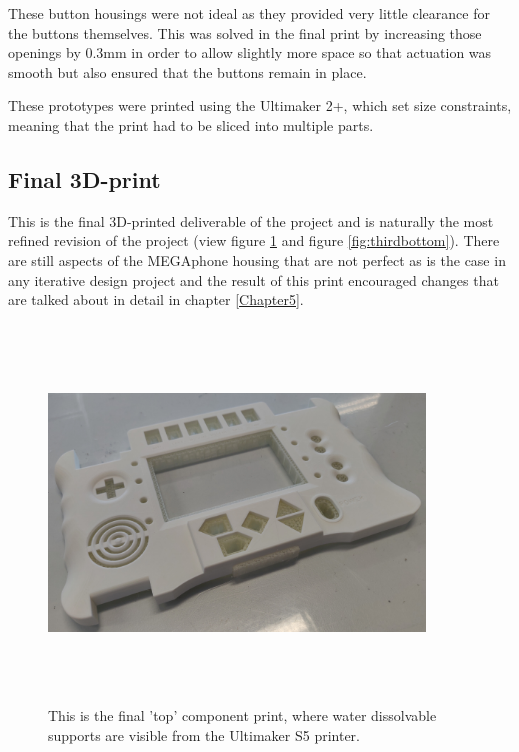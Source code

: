 These button housings were not ideal as they provided very little clearance for the buttons themselves.
This was solved in the final print by increasing those openings by 0.3mm in order to allow slightly more space so that actuation was smooth but also ensured that the buttons remain in place.

These prototypes were printed using the Ultimaker 2+, which set size constraints, meaning that the print had to be sliced into multiple parts.

\subsection{Final 3D-print} \label{FinalPrint}

This is the final 3D-printed deliverable of the project and is naturally the most refined revision of the project (view figure \ref{fig:thirdtop} and figure \ref{fig:thirdbottom}). 
There are still aspects of the MEGAphone housing that are not perfect as is the case in any iterative design project and the result of this print encouraged changes that are talked about in detail in chapter \ref{Chapter5}.

\begin{figure} [h]
    \centering
    \includegraphics[width=10cm,height=10cm,keepaspectratio]{Figures/topwatersupport.png}
    \caption{This is the final 'top' component print, where water dissolvable supports are visible from the Ultimaker S5 printer.}
    \label{fig:thirdtop}
\end{figure}

